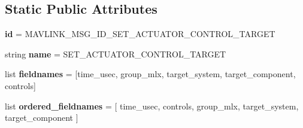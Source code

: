 \subsection*{Static Public Attributes}
\begin{DoxyCompactItemize}
\item 
\mbox{\label{classpymavlink_1_1dialects_1_1v10_1_1MAVLink__set__actuator__control__target__message_a90fdb04e62d45dae66608e8e7bd73a35}} 
{\bfseries id} = M\+A\+V\+L\+I\+N\+K\+\_\+\+M\+S\+G\+\_\+\+I\+D\+\_\+\+S\+E\+T\+\_\+\+A\+C\+T\+U\+A\+T\+O\+R\+\_\+\+C\+O\+N\+T\+R\+O\+L\+\_\+\+T\+A\+R\+G\+ET
\item 
\mbox{\label{classpymavlink_1_1dialects_1_1v10_1_1MAVLink__set__actuator__control__target__message_aaa94b69a94995c6c3468d19f325958cb}} 
string {\bfseries name} = \textquotesingle{}S\+E\+T\+\_\+\+A\+C\+T\+U\+A\+T\+O\+R\+\_\+\+C\+O\+N\+T\+R\+O\+L\+\_\+\+T\+A\+R\+G\+ET\textquotesingle{}
\item 
\mbox{\label{classpymavlink_1_1dialects_1_1v10_1_1MAVLink__set__actuator__control__target__message_aee7bab87e3d4be6eb8f9b58aaa927deb}} 
list {\bfseries fieldnames} = \mbox{[}\textquotesingle{}time\+\_\+usec\textquotesingle{}, \textquotesingle{}group\+\_\+mlx\textquotesingle{}, \textquotesingle{}target\+\_\+system\textquotesingle{}, \textquotesingle{}target\+\_\+component\textquotesingle{}, \textquotesingle{}controls\textquotesingle{}\mbox{]}
\item 
\mbox{\label{classpymavlink_1_1dialects_1_1v10_1_1MAVLink__set__actuator__control__target__message_ab64c8dc6357f633bdd9b4d349ec9b333}} 
list {\bfseries ordered\+\_\+fieldnames} = \mbox{[} \textquotesingle{}time\+\_\+usec\textquotesingle{}, \textquotesingle{}controls\textquotesingle{}, \textquotesingle{}group\+\_\+mlx\textquotesingle{}, \textquotesingle{}target\+\_\+system\textquotesingle{}, \textquotesingle{}target\+\_\+component\textquotesingle{} \mbox{]}
\item 
\mbox{\label{classpymavlink_1_1dialects_1_1v10_1_1MAVLink__set__actuator__control__target__message_aafecb333506144e8b6cc2648a6bccd3c}} 

\end{DoxyCompactItemize}

